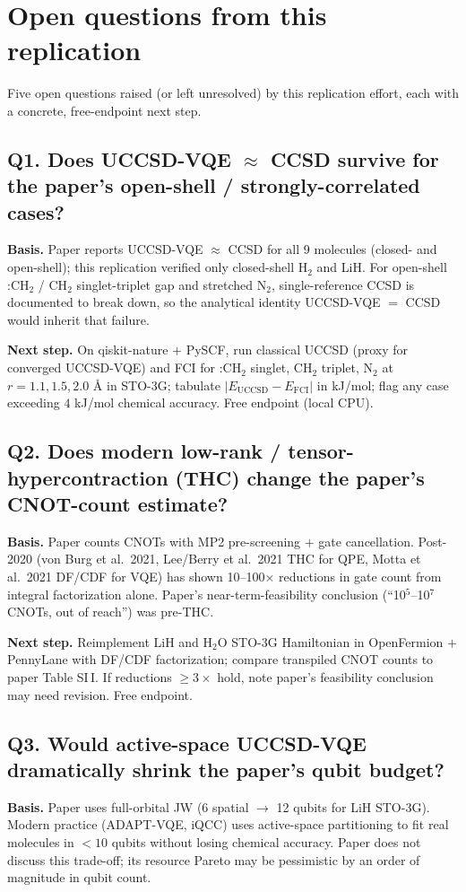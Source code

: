 \section{Open questions from this replication}

Five open questions raised (or left unresolved) by this replication effort,
each with a concrete, free-endpoint next step.

\subsection*{Q1. Does UCCSD-VQE $\approx$ CCSD survive for the paper's open-shell / strongly-correlated cases?}
\textbf{Basis.} Paper reports UCCSD-VQE $\approx$ CCSD for all 9 molecules
(closed- and open-shell); this replication verified only closed-shell
H$_2$ and LiH. For open-shell :CH$_2$ / CH$_2$ singlet-triplet gap and
stretched N$_2$, single-reference CCSD is documented to break down, so
the analytical identity UCCSD-VQE $=$ CCSD would inherit that failure.

\textbf{Next step.} On qiskit-nature $+$ PySCF, run classical UCCSD (proxy
for converged UCCSD-VQE) and FCI for :CH$_2$ singlet, CH$_2$ triplet,
N$_2$ at $r=1.1, 1.5, 2.0$ \AA{} in STO-3G; tabulate
$|E_\text{UCCSD}-E_\text{FCI}|$ in kJ/mol; flag any case exceeding
$4$ kJ/mol chemical accuracy. Free endpoint (local CPU).

\subsection*{Q2. Does modern low-rank / tensor-hypercontraction (THC) change the paper's CNOT-count estimate?}
\textbf{Basis.} Paper counts CNOTs with MP2 pre-screening $+$ gate
cancellation. Post-2020 (von Burg et al.\ 2021, Lee/Berry et al.\ 2021 THC
for QPE, Motta et al.\ 2021 DF/CDF for VQE) has shown 10--100$\times$
reductions in gate count from integral factorization alone. Paper's
near-term-feasibility conclusion (``10$^5$--10$^7$ CNOTs, out of reach'')
was pre-THC.

\textbf{Next step.} Reimplement LiH and H$_2$O STO-3G Hamiltonian in
OpenFermion $+$ PennyLane with DF/CDF factorization; compare transpiled
CNOT counts to paper Table SI\,I. If reductions $\ge 3\times$ hold, note
paper's feasibility conclusion may need revision. Free endpoint.

\subsection*{Q3. Would active-space UCCSD-VQE dramatically shrink the paper's qubit budget?}
\textbf{Basis.} Paper uses full-orbital JW (6 spatial $\to$ 12 qubits for
LiH STO-3G). Modern practice (ADAPT-VQE, iQCC) uses active-space
partitioning to fit real molecules in $<10$ qubits without losing
chemical accuracy. Paper does not discuss this trade-off; its resource
Pareto may be pessimistic by an order of magnitude in qubit count.

